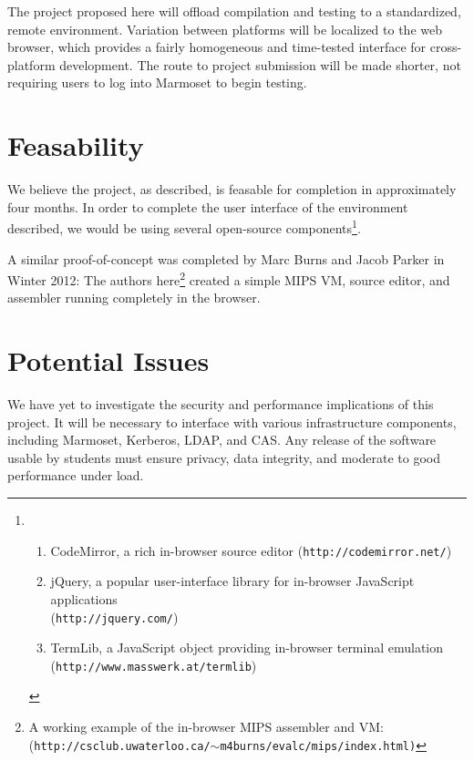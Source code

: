\documentclass[12pt]{paper}
\begin{document}
	The project proposed here will offload compilation and testing to a standardized, remote environment. Variation
	between platforms will be localized to the web browser, which provides a fairly homogeneous and time-tested interface
	for cross-platform development. The route to project submission will be made shorter, not requiring users to log
  into Marmoset to begin testing.

	\section{Feasability}
  We believe the project, as described, is feasable for completion in approximately four months. In order to
  complete the user interface of the environment described, we would be using several open-source components\footnote{\begin{enumerate}[{\indent i.}]
              \setlength{\itemsep}{0pt}
              \setlength{\parskip}{0pt}
              \item CodeMirror, a rich in-browser source editor ({\tt http://codemirror.net/})
              \item jQuery, a popular user-interface library for in-browser JavaScript applications\\({\tt http://jquery.com/})
              \item TermLib, a JavaScript object providing in-browser terminal emulation\\({\tt http://www.masswerk.at/termlib})
            \end{enumerate}}.

  A similar proof-of-concept was completed by Marc Burns and Jacob Parker in Winter 2012: The authors here\footnote{A working example of the in-browser MIPS assembler and VM:\\
            \indent\indent (\tt{http://csclub.uwaterloo.ca/$\sim$m4burns/evalc/mips/index.html})}
  created a simple MIPS VM, source editor, and assembler running completely in the browser.
	
\newpage
	\section{Potential Issues}
  We have yet to investigate the security and performance implications of this project. It will be necessary to
  interface with various infrastructure components, including Marmoset, Kerberos, LDAP, and CAS. Any release
  of the software usable by students must ensure privacy, data integrity, and moderate to good performance under
  load.
\end{document}
